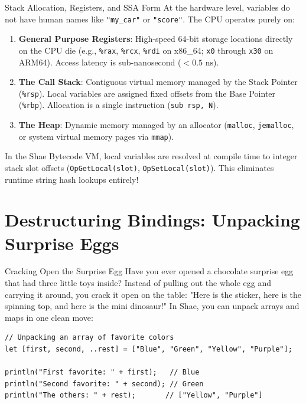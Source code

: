 \begin{deepbox}{Stack Allocation, Registers, and SSA Form}
At the hardware level, variables do not have human names like \texttt{"my\_car"} or \texttt{"score"}. The CPU operates purely on:
\begin{enumerate}
    \item \textbf{General Purpose Registers}: High-speed 64-bit storage locations directly on the CPU die (e.g., \texttt{\%rax}, \texttt{\%rcx}, \texttt{\%rdi} on x86\_64; \texttt{x0} through \texttt{x30} on ARM64). Access latency is sub-nanosecond ($<0.5\text{ ns}$).
    \item \textbf{The Call Stack}: Contiguous virtual memory managed by the Stack Pointer (\texttt{\%rsp}). Local variables are assigned fixed offsets from the Base Pointer (\texttt{\%rbp}). Allocation is a single instruction (\texttt{sub rsp, N}).
    \item \textbf{The Heap}: Dynamic memory managed by an allocator (\texttt{malloc}, \texttt{jemalloc}, or system virtual memory pages via \texttt{mmap}).
\end{enumerate}
In the Shae Bytecode VM, local variables are resolved at compile time to integer stack slot offsets (\texttt{OpGetLocal(slot)}, \texttt{OpSetLocal(slot)}). This eliminates runtime string hash lookups entirely!
\end{deepbox}

\section{Destructuring Bindings: Unpacking Surprise Eggs}

\begin{kidbox}{Cracking Open the Surprise Egg}
Have you ever opened a chocolate surprise egg that had three little toys inside?
Instead of pulling out the whole egg and carrying it around, you crack it open on the table:
"Here is the sticker, here is the spinning top, and here is the mini dinosaur!"
In Shae, you can unpack arrays and maps in one clean move:
\begin{lstlisting}[language=shaelang]
// Unpacking an array of favorite colors
let [first, second, ..rest] = ["Blue", "Green", "Yellow", "Purple"];

println("First favorite: " + first);   // Blue
println("Second favorite: " + second); // Green
println("The others: " + rest);       // ["Yellow", "Purple"]
\end{lstlisting}
\end{kidbox}

